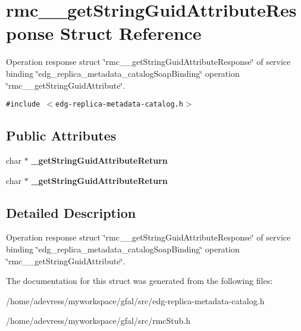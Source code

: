 \section{rmc\_\-\_\-get\-String\-Guid\-Attribute\-Response Struct Reference}
\label{structrmc____getStringGuidAttributeResponse}
Operation response struct \char`\"{}rmc\_\-\_\-get\-String\-Guid\-Attribute\-Response\char`\"{} of service binding \char`\"{}edg\_\-replica\_\-metadata\_\-catalog\-Soap\-Binding\char`\"{} operation \char`\"{}rmc\_\-\_\-get\-String\-Guid\-Attribute\char`\"{}.  


{\tt \#include $<$edg-replica-metadata-catalog.h$>$}

\subsection*{Public Attributes}
\begin{CompactItemize}
\item 
char $\ast$ \textbf{\_\-get\-String\-Guid\-Attribute\-Return}\label{structrmc____getStringGuidAttributeResponse_0179fdfdc46b2b289ee766a1a274d9a1}

\item 
char $\ast$ \textbf{\_\-get\-String\-Guid\-Attribute\-Return}\label{structrmc____getStringGuidAttributeResponse_0179fdfdc46b2b289ee766a1a274d9a1}

\end{CompactItemize}


\subsection{Detailed Description}
Operation response struct \char`\"{}rmc\_\-\_\-get\-String\-Guid\-Attribute\-Response\char`\"{} of service binding \char`\"{}edg\_\-replica\_\-metadata\_\-catalog\-Soap\-Binding\char`\"{} operation \char`\"{}rmc\_\-\_\-get\-String\-Guid\-Attribute\char`\"{}. 



The documentation for this struct was generated from the following files:\begin{CompactItemize}
\item 
/home/adevress/myworkspace/gfal/src/edg-replica-metadata-catalog.h\item 
/home/adevress/myworkspace/gfal/src/rmc\-Stub.h\end{CompactItemize}
